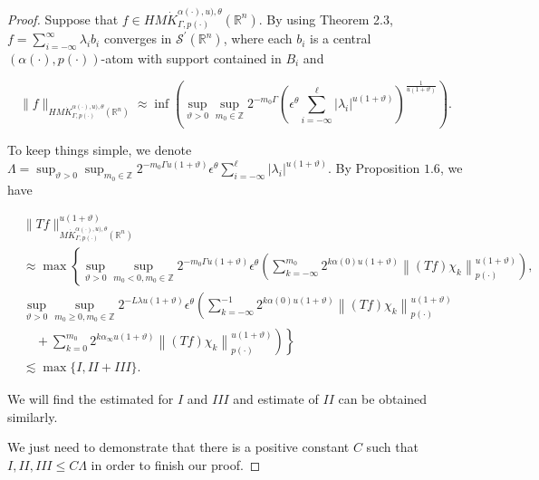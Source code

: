 \documentclass[10pt,a4paper]{amsart}
\begin{document}
\begin{proof}
    



 Suppose that  $f \in  H {M \dot{K} ^{\alpha(\cdot),u),\theta}_{ \Gamma, p(\cdot)}(\mathbb{R}^n)}$. By using Theorem 2.3, $f=\sum_{i=-\infty}^{\infty} \lambda_{i} b_{i}$ converges in $\mathcal{S}^{\prime}\left(\mathbb{R}^{n}\right)$, where each $b_{i}$ is a central $(\alpha(\cdot), p(\cdot))$-atom with support contained in $B_{i}$ and


\begin{equation*}
\|f\|_ {H {M \dot{K} ^{\alpha(\cdot),u),\theta}_{ \Gamma, p(\cdot)}(\mathbb{R}^n)}} \approx \inf \left(\sup_{\vartheta>0 }\sup _{m_0\in  \mathbb{Z}} 2^{-m_0\Gamma}\left(\epsilon  ^\theta\sum_{i=-\infty}^{\ell }\left|\lambda_{i}\right|^{u(1+\vartheta)}\right)^{\frac{1}{u(1+\vartheta)}}\right) . \tag{73}
\end{equation*}


To keep things simple, we denote 
 $\Lambda=\sup_{\vartheta>0 }\sup _{m_0\in  \mathbb{Z}} 2^{-m_0\Gamma u(1+\vartheta)}\epsilon  ^\theta \sum_{i=-\infty}^{\ell }\left|\lambda_{i}\right|^{u(1+\vartheta)}$. By Proposition $1.6$, we have


\begin{align*}
& \|T f\|_{M \dot{K} ^{\alpha(\cdot),u),\theta}_{ \Gamma, p(\cdot)}(\mathbb{R}^n)}^{u(1+\vartheta)} \\
& \approx \max \left\{\sup_{\vartheta>0 }\sup _{m_0<0, m_0\in  \mathbb{Z}} 2^{-m_0\Gamma u(1+\vartheta)} \epsilon  ^\theta \left(\sum_{k=-\infty}^{m_0} 2^{k  \alpha(0) u(1+\vartheta)}\left\|(T f) \chi_{k}\right\|_{{p(\cdot)}}^{u(1+\vartheta)}\right),\right. \\
& \sup_{\vartheta>0 }\sup _{m_0\geq 0, m_0\in  \mathbb{Z}} 2^{-L \lambda u(1+\vartheta)} \epsilon  ^\theta \left(\sum_{k=-\infty}^{-1} 2^{k  \alpha(0) u(1+\vartheta)}\left\|(T f) \chi_{k}\right\|_{{p(\cdot)}}^{u(1+\vartheta)}\right. \\
& \left.\left.\quad+\sum_{k=0}^{m_0} 2^{k \alpha_\infty u(1+\vartheta)}\left\|(T f) \chi_{k}\right\|_{{p(\cdot)}}^{u(1+\vartheta)}\right)\right\} \\
& \lesssim \max \{I, I I+I I I\}. 
\end{align*}


We will find the estimated for $I$ and $III$ and estimate of $II$ can be obtained similarly. 


We just need to demonstrate that there is a positive constant $C$ such that $I, I I, I I I \leq C \Lambda$ in order to finish our proof.


\end{proof}
\end{document}
